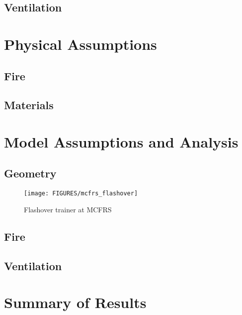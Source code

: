 \documentclass[11pt]{book}
\begin{document}
\subsection{Ventilation}

\section{Physical Assumptions}
\subsection{Fire}

\subsection{Materials}

\section{Model Assumptions and Analysis}
\subsection{Geometry}
\begin{figure}[\figoptions]
\begin{center}
\texttt{[image: FIGURES/mcfrs\_flashover]}
\end{center}
\caption {Flashover trainer at MCFRS}
\label{figflashoversmoke}%
\end{figure}

\subsection{Fire}

\subsection{Ventilation}

\section{Summary of Results}
\end{document}
